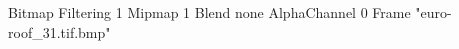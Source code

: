{Bitmap
	{Filtering 1}
	{Mipmap 1}
	{Blend none}
	{AlphaChannel 0}
	{Frame "euro-roof_31.tif.bmp"}
}
